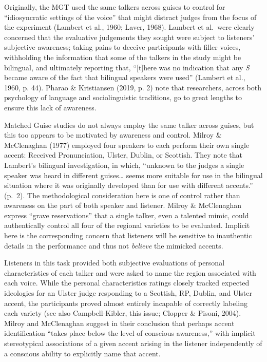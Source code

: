 \documentclass[
  letterpaper,
  DIV=11,
  numbers=noendperiod]{scrartcl}
\begin{document}
Originally, the MGT used the same talkers across guises to control for
``idiosyncratic settings of the voice'' that might distract judges from
the focus of the experiment (Lambert et al., 1960; Laver, 1968). Lambert
et al.~were clearly concerned that the evaluative judgements they sought
were subject to listeners' subjective awareness; taking pains to deceive
participants with filler voices, withholding the information that some
of the talkers in the study might be bilingual, and ultimately reporting
that, ``{[}t{]}here was no indication that any \emph{S} became aware of
the fact that bilingual speakers were used'' (Lambert et al., 1960, p.
44). Pharao \& Kristiansen (2019, p. 2) note that researchers, across
both psychology of language and sociolinguistic traditions, go to great
lengths to ensure this lack of awareness.

Matched Guise studies do not always employ the same talker across
guises, but this too appears to be motivated by awareness and control.
Milroy \& McClenaghan (1977) employed four speakers to each perform
their own single accent: Received Pronunciation, Ulster, Dublin, or
Scottish. They note that Lambert's bilingual investigation, in which,
``unknown to the judges a single speaker was heard in different
guises\ldots{} seems more suitable for use in the bilingual situation
where it was originally developed than for use with different accents.''
(p.~2). The methodological consideration here is one of control rather
than awareness on the part of both speaker and listener. Milroy \&
McClenaghan express ``grave reservations'' that a single talker, even a
talented mimic, could authentically control all four of the regional
varieties to be evaluated. Implicit here is the corresponding concern
that listeners will be sensitive to inauthentic details in the
performance and thus not \emph{believe} the mimicked accents.

Listeners in this task provided both subjective evaluations of personal
characteristics of each talker and were asked to name the region
associated with each voice. While the personal characteristics ratings
closely tracked expected ideologies for an Ulster judge responding to a
Scottish, RP, Dublin, and Ulster accent, the participants proved almost
entirely incapable of correctly labeling each variety (see also
Campbell-Kibler, this issue; Clopper \& Pisoni, 2004). Milroy and
McClenaghan suggest in their conclusion that perhaps accent
identification ``takes place below the level of conscious awareness,''
with implicit stereotypical associations of a given accent arising in
the listener independently of a conscious ability to explicitly name
that accent.
\end{document}
